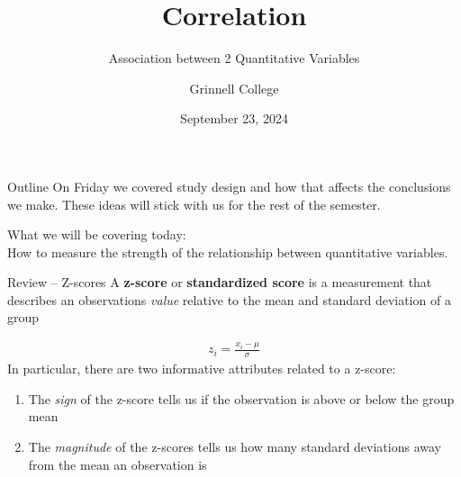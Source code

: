 \documentclass{beamer}
\title[SST-115 / STA-209]{Correlation}
\subtitle{Association between 2 Quantitative Variables}
\author{Grinnell College}
\date{September 23, 2024}
\begin{document}
\begin{frame}
  \titlepage
\end{frame}



\begin{frame}{Outline}
On Friday we covered study design and how that affects the conclusions we make. These ideas will stick with us for the rest of the semester. \vspace{10mm}

What we will be covering today:\\
\vspace{3mm}
How to measure the strength of the relationship between quantitative variables.
\end{frame}



\begin{frame}{Review -- Z-scores}
A \textbf{z-score} or \textbf{standardized score} is a measurement that describes an observations \textit{value} relative to the mean and standard deviation of a group

\begin{align*}
z_i = \frac{x_i - \mu}{\sigma}
\end{align*}
\vspace{4mm}
In particular, there are two informative attributes related to a z-score:
\begin{enumerate}
\item The \textit{sign} of the z-score tells us if the observation is above or below the group mean
\item The \textit{magnitude} of the z-scores tells us how many standard deviations away from the mean an observation is
\end{enumerate}
\end{frame}
\end{document}
